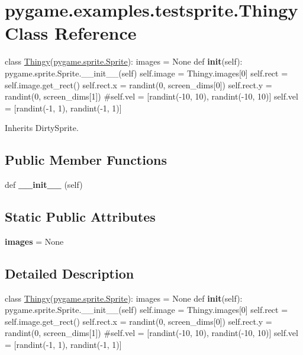 \hypertarget{classpygame_1_1examples_1_1testsprite_1_1_thingy}{}\section{pygame.\+examples.\+testsprite.\+Thingy Class Reference}
\label{classpygame_1_1examples_1_1testsprite_1_1_thingy}


class \hyperlink{classpygame_1_1examples_1_1testsprite_1_1_thingy}{Thingy}(\hyperlink{classpygame_1_1sprite_1_1_sprite}{pygame.\+sprite.\+Sprite})\+: images = None def {\bfseries init}(self)\+: pygame.\+sprite.\+Sprite.\+\_\+\+\_\+init\+\_\+\+\_\+(self) self.\+image = Thingy.\+images\mbox{[}0\mbox{]} self.\+rect = self.\+image.\+get\+\_\+rect() self.\+rect.\+x = randint(0, screen\+\_\+dims\mbox{[}0\mbox{]}) self.\+rect.\+y = randint(0, screen\+\_\+dims\mbox{[}1\mbox{]}) \#self.\+vel = \mbox{[}randint(-\/10, 10), randint(-\/10, 10)\mbox{]} self.\+vel = \mbox{[}randint(-\/1, 1), randint(-\/1, 1)\mbox{]}  




Inherits Dirty\+Sprite.

\subsection*{Public Member Functions}
\begin{DoxyCompactItemize}
\item 
\mbox{\label{classpygame_1_1examples_1_1testsprite_1_1_thingy_af7c9374abd8007ba9593648cd7ad3d23}} 
def {\bfseries \+\_\+\+\_\+init\+\_\+\+\_\+} (self)
\end{DoxyCompactItemize}
\subsection*{Static Public Attributes}
\begin{DoxyCompactItemize}
\item 
\mbox{\label{classpygame_1_1examples_1_1testsprite_1_1_thingy_afac85d1016fa562327df33eb3162e384}} 
{\bfseries images} = None
\end{DoxyCompactItemize}


\subsection{Detailed Description}
class \hyperlink{classpygame_1_1examples_1_1testsprite_1_1_thingy}{Thingy}(\hyperlink{classpygame_1_1sprite_1_1_sprite}{pygame.\+sprite.\+Sprite})\+: images = None def {\bfseries init}(self)\+: pygame.\+sprite.\+Sprite.\+\_\+\+\_\+init\+\_\+\+\_\+(self) self.\+image = Thingy.\+images\mbox{[}0\mbox{]} self.\+rect = self.\+image.\+get\+\_\+rect() self.\+rect.\+x = randint(0, screen\+\_\+dims\mbox{[}0\mbox{]}) self.\+rect.\+y = randint(0, screen\+\_\+dims\mbox{[}1\mbox{]}) \#self.\+vel = \mbox{[}randint(-\/10, 10), randint(-\/10, 10)\mbox{]} self.\+vel = \mbox{[}randint(-\/1, 1), randint(-\/1, 1)\mbox{]} 

